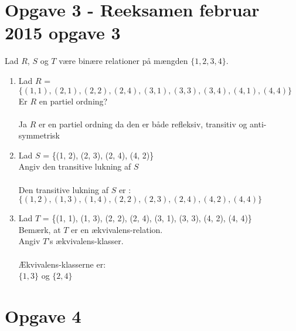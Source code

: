 \documentclass[20pt]{article}
\begin{document}
	\section*{Opgave 3 - Reeksamen februar 2015 opgave 3}
Lad \(R\), \(S\) og \(T\) være binære relationer på mængden \(\{1, 2, 3, 4\}\).
\begin{enumerate}[label=(\alph*)]
	\item 
	Lad \(R\) = \(\{(1, 1), (2, 1), (2, 2), (2, 4), (3, 1), (3, 3), (3, 4), (4, 1), (4, 4)\}\)\\
	Er \(R\) en partiel ordning?\\ \\
	Ja \(R\) er en partiel ordning da den er både refleksiv, transitiv og anti-symmetrisk\\
	\item
	Lad \(S\) = \{(1, 2), (2, 3), (2, 4), (4, 2)\}\\
	Angiv den transitive lukning af \(S\) \\ \\
	Den transitive lukning af \(S\) er : \\
	\(\{(1, 2), (1, 3), (1, 4), (2, 2), (2, 3), (2, 4), (4, 2), (4, 4)\}\)\\
	\item
	Lad \(T\) = \{(1, 1), (1, 3), (2, 2), (2, 4), (3, 1), (3, 3), (4, 2), (4, 4)\}\\
	Bemærk, at \(T\) er en ækvivalens-relation.\\
	Angiv \(T\)'s ækvivalens-klasser.\\ \\
	Ækvivalens-klasserne er:\\
	\(\{1, 3\}\) og \(\{2, 4\}\)\\
\end{enumerate}
	
	
	
	\section*{Opgave 4}
	

	
	
	
	
\end{document}
